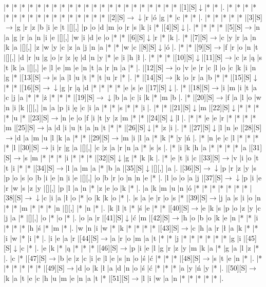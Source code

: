 \documentclass[11pt]{article}
\newcommand\drarr{$\rightarrow \!\!\!\!\! \downarrow$}
\newcommand\rarr{$\rightarrow$}
\newcommand\darr{$\downarrow$}
\begin{document}
\noindent\begin{Puzzle}{24}{28}|*	|*	|*	|*	|*	|*	|*	|*	|*	|*	|*	|*	|*	|*	|*	|*	|*	|*	|*	|*	|*	|*	|[1][S]\darr	|*	|*	|.
|*	|*	|*	|*	|*	|*	|*	|*	|*	|*	|*	|*	|*	|*	|*	|*	|*	|[2][S]\drarr	|r	|ó	|g	|*	|c	|*	|*	|.
|*	|*	|*	|*	|*	|[3][S]\rarr	|g	|r	|z	|b	|i	|e	|t	|[][,]{ }	|p	|o	|d	|m	|o	|r	|s	|k	|i	|*	|[4][S]\darr	|.
|*	|*	|*	|*	|[5][S]\rarr	|n	|a	|g	|r	|a	|n	|i	|e	|[][,]{ }	|w	|i	|d	|e	|o	|*	|*	|[6][S]\darr	|r	|*	|k	|.
|*	|[7][S]\rarr	|c	|y	|r	|a	|n	|k	|a	|[][,]{ }	|z	|w	|y	|c	|z	|a	|j	|n	|a	|*	|*	|w	|c	|[8][S]\darr	|ó	|.
|*	|*	|[9][S]\rarr	|f	|r	|o	|n	|t	|[][,]{ }	|d	|r	|u	|g	|o	|r	|z	|ę	|d	|n	|y	|*	|e	|i	|h	|ł	|.
|*	|*	|*	|[10][S]\darr	|[11][S]\rarr	|c	|z	|ą	|s	|t	|k	|a	|[][,]{ }	|e	|l	|e	|m	|e	|n	|t	|a	|r	|n	|a	|*	|.
|[12][S]\rarr	|o	|v	|e	|r	|c	|l	|o	|c	|k	|i	|n	|g	|*	|[13][S]\rarr	|s	|a	|l	|u	|t	|*	|t	|u	|r	|*	|.
|*	|[14][S]\rarr	|k	|o	|r	|a	|b	|*	|*	|[15][S]\darr	|*	|*	|[16][S]\drarr	|g	|r	|ą	|d	|*	|*	|*	|*	|e	|s	|e	|[17][S]\darr	|.
|*	|[18][S]\rarr	|i	|m	|i	|t	|a	|c	|j	|a	|*	|*	|ż	|*	|*	|*	|[19][S]\drarr	|b	|a	|c	|i	|k	|*	|m	|b	|.
|*	|[20][S]\rarr	|f	|a	|l	|o	|w	|n	|i	|k	|[][,]{ }	|n	|a	|p	|i	|ę	|c	|i	|a	|*	|*	|s	|*	|*	|i	|.
|*	|*	|[21][S]\darr	|m	|[22][S]\darr	|*	|*	|*	|*	|u	|*	|[23][S]\rarr	|n	|e	|o	|f	|i	|t	|y	|z	|m	|*	|*	|[24][S]\darr	|l	|.
|*	|*	|e	|e	|r	|*	|*	|*	|*	|m	|[25][S]\rarr	|a	|d	|i	|u	|t	|a	|n	|t	|*	|*	|[26][S]\darr	|*	|z	|i	|.
|*	|[27][S]\darr	|l	|n	|e	|[28][S]\rarr	|d	|a	|m	|u	|l	|k	|a	|*	|*	|[29][S]\rarr	|m	|i	|l	|a	|*	|k	|*	|y	|ń	|.
|*	|n	|e	|c	|l	|*	|*	|*	|*	|l	|[30][S]\rarr	|i	|r	|g	|a	|[][,]{ }	|c	|z	|a	|r	|n	|a	|*	|s	|s	|.
|*	|i	|k	|h	|a	|*	|*	|*	|*	|a	|[31][S]\rarr	|s	|m	|*	|*	|*	|i	|*	|*	|*	|[32][S]\darr	|g	|*	|k	|k	|.
|*	|e	|t	|i	|c	|[33][S]\rarr	|v	|i	|o	|t	|t	|i	|*	|*	|[34][S]\rarr	|l	|a	|m	|a	|*	|b	|a	|[35][S]\darr	|[][,]{ }	|a	|.
|[36][S]\drarr	|p	|r	|z	|y	|s	|p	|o	|s	|o	|b	|i	|e	|n	|i	|e	|[][,]{ }	|o	|b	|r	|o	|n	|n	|e	|*	|.
|l	|o	|o	|a	|j	|[37][S]\drarr	|p	|i	|e	|r	|w	|s	|z	|y	|[][,]{ }	|p	|l	|a	|n	|*	|z	|e	|o	|k	|*	|.
|a	|k	|m	|u	|n	|ó	|*	|*	|*	|*	|*	|*	|*	|[38][S]\drarr	|c	|i	|a	|ł	|o	|*	|o	|k	|k	|o	|*	|.
|s	|a	|e	|r	|o	|s	|*	|[39][S]\rarr	|j	|a	|s	|i	|o	|n	|*	|*	|m	|*	|*	|*	|n	|[][,]{ }	|*	|n	|*	|.
|k	|l	|t	|*	|ś	|e	|*	|*	|[40][S]\rarr	|e	|k	|s	|p	|o	|z	|y	|c	|j	|a	|*	|[][,]{ }	|o	|*	|o	|*	|.
|o	|a	|r	|[41][S]\darr	|ć	|m	|[42][S]\rarr	|h	|o	|b	|o	|k	|e	|n	|*	|*	|i	|*	|*	|*	|h	|ś	|*	|m	|*	|.
|w	|n	|i	|w	|*	|k	|*	|*	|*	|*	|[43][S]\rarr	|c	|h	|a	|r	|ł	|a	|k	|*	|*	|i	|w	|*	|i	|*	|.
|i	|e	|a	|r	|[44][S]\rarr	|a	|r	|o	|m	|a	|t	|*	|*	|j	|*	|*	|*	|*	|*	|*	|g	|i	|[45][S]\darr	|c	|*	|.
|e	|k	|*	|ą	|*	|*	|*	|[46][S]\rarr	|p	|i	|e	|l	|g	|r	|z	|y	|m	|k	|a	|*	|g	|a	|l	|z	|*	|.
|c	|*	|[47][S]\rarr	|b	|e	|z	|c	|i	|e	|l	|e	|s	|n	|o	|ś	|ć	|*	|*	|*	|[48][S]\rarr	|s	|t	|e	|n	|*	|.
|*	|*	|*	|*	|*	|*	|[49][S]\rarr	|d	|o	|k	|ł	|a	|d	|n	|o	|ś	|ć	|*	|*	|*	|a	|y	|ń	|y	|*	|.
|[50][S]\rarr	|k	|a	|t	|e	|c	|h	|u	|m	|e	|n	|a	|t	|*	|[51][S]\rarr	|l	|i	|w	|a	|n	|*	|*	|*	|*	|*	|.\end{Puzzle}
\end{document}
